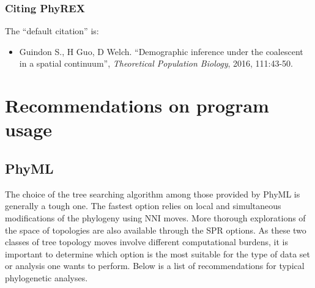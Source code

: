 \documentclass[a4paper,12pt]{article}
\begin{document}
\subsubsection{Citing PhyREX}

The ``default citation'' is:

\begin{itemize}
\item Guindon S.,  H Guo, D Welch. ``Demographic inference under the coalescent in a spatial
  continuum'', {\it Theoretical Population Biology}, 2016, 111:43-50.
\end{itemize}

\section{Recommendations on program usage}\label{sec:progusage}

\subsection{PhyML}

The choice of the  tree searching algorithm among those provided by PhyML  is generally a tough one.
The  fastest option  relies  on local  and simultaneous  modifications  of the  phylogeny using  NNI
moves. More  thorough explorations of  the space  of topologies are  also available through  the SPR
options.  As these  two classes of tree topology moves involve  different computational burdens, it
is important to determine which option is the most suitable for the type of data set or analysis one
wants to perform. Below is a list of recommendations for typical phylogenetic analyses.
\end{document}
